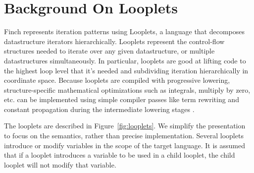 \section{Background On Looplets}
Finch represents iteration patterns using Looplets, a language that decomposes datastructure iterators hierarchically. 
%
Looplets represent the control-flow structures needed to iterate over any given datastructure, or multiple datastructures simultaneously. 
%
In particular, looplets are good at lifting code to the highest loop level that it's needed and subdividing iteration hierarchically in coordinate space.
%
Because looplets are compiled with progressive lowering, structure-specific mathematical optimizations such as integrals, multiply by zero, etc. can be implemented using simple compiler passes like term rewriting and constant propagation during the intermediate lowering stages \cite{ahrens_looplets_2023}.

The looplets are described in Figure~\ref{fig:looplets}. We simplify the presentation to focus on the semantics, rather than precise implementation.  Several looplets introduce or modify variables in the scope of the target language. It is assumed that if a looplet introduces a variable to be used in a child looplet, the child looplet will not modify that variable.

